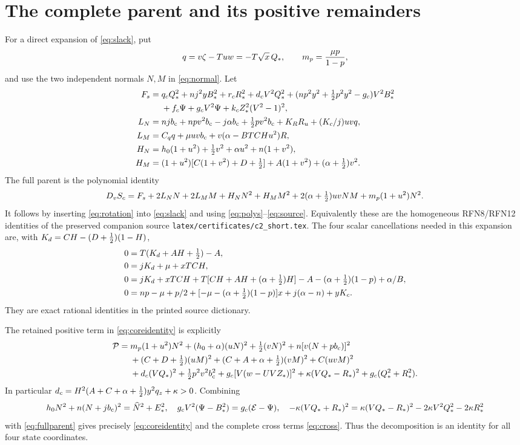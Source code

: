 \section{The complete parent and its positive remainders}\label{app:parent}
For a direct expansion of \eqref{eq:slack}, put
\[
 q=v\zeta-Tuw=-T\sqrt x\,Q_*,\qquad
 m_p=\frac{\mu p}{1-p},
\]
and use the two independent normals $N,M$ in \eqref{eq:normal}.
Let
\begin{align}
 F_s={}&q_cQ_*^2+nj^2yB_*^2+r_cR_*^2+d_cV^2Q_*^2
 +(np^2y^2+\tfrac12 p^2y^2-g_c)V^2B_*^2\notag\\
 &+f_c\Psi+g_cV^2\Psi+k_cZ_*^2(V^2-1)^2,\notag\\
 L_N={}&njb_{\mathrm c}+npv^2b_{\mathrm c}-j\alpha b_{\mathrm c}+\tfrac12 pv^2b_{\mathrm c}
                         +K_RR_u+(K_c/j)uvq,\notag\\
 L_M={}&C_qq+\mu uvb_{\mathrm c}+v(\alpha-BTCHu^2)R,\notag\\
 H_N={}&h_0(1+u^2)+\tfrac12 v^2+\alpha u^2+n(1+v^2),\notag\\
 H_M={}&(1+u^2)[C(1+v^2)+D+\tfrac12]+A(1+v^2)+(\alpha+\tfrac12)v^2 .
 \label{eq:parentcoeff}
\end{align}
The full parent is the polynomial identity
\begin{equation}
 D_vS_c=F_s+2L_NN+2L_MM+H_NN^2+H_MM^2+
              2(\alpha+\tfrac12)uvNM+m_p(1+u^2)N^2 .
 \label{eq:fullparent}
\end{equation}
It follows by inserting \eqref{eq:rotation} into \eqref{eq:slack} and
using \eqref{eq:polys}--\eqref{eq:source}.
Equivalently these are the homogeneous RFN8/RFN12 identities of the
preserved companion source \texttt{latex/certificates/c2\_short.tex}.
The four scalar cancellations needed in this expansion are, with
$K_d=CH-(D+\tfrac12)(1-H)$,
\begin{align*}
 0&=T(K_d+AH+\tfrac12)-A,\\
 0&=jK_d+\mu+xTCH,\\
 0&=jK_d+xTCH+T[CH+AH+(\alpha+\tfrac12)H]
                   -A-(\alpha+\tfrac12)(1-p)+\alpha/B,\\
 0&=np-\mu+p/2+[-\mu-(\alpha+\tfrac12)(1-p)]x+j(\alpha-n)+yK_c .
\end{align*}
They are exact rational identities in the printed source dictionary.

The retained positive term in \eqref{eq:coreidentity} is explicitly
\begin{align}
 \mathcal P={}&m_p(1+u^2)N^2+(h_0+\alpha)(uN)^2
             +\tfrac12(vN)^2+n[v(N+pb_{\mathrm c})]^2\notag\\
 &+(C+D+\tfrac12)(uM)^2+(C+A+\alpha+\tfrac12)(vM)^2+C(uvM)^2\notag\\
 &+d_c(VQ_*)^2+\tfrac12 p^2v^2b_{\mathrm c}^2
            +g_c[V(w-UVZ_*)]^2+\kappa(VQ_*-R_*)^2
            +g_c(Q_*^2+R_*^2).
 \label{eq:retainedall}
\end{align}
In particular $d_c=H^2(A+C+\alpha+\tfrac12)y^2q_z+\kappa>0$.
Combining
\[
 h_0N^2+n(N+jb_{\mathrm c})^2=\widehat N^2+E_*^2,\quad
 g_cV^2(\Psi-B_*^2)=g_c(\mathcal E-\Psi),\quad
 -\kappa(VQ_*+R_*)^2
 =\kappa(VQ_*-R_*)^2-2\kappa V^2Q_*^2-2\kappa R_*^2
\]
with \eqref{eq:fullparent} gives precisely \eqref{eq:coreidentity}
and the complete cross terms \eqref{eq:cross}.
Thus the decomposition is an identity for all four state coordinates.

